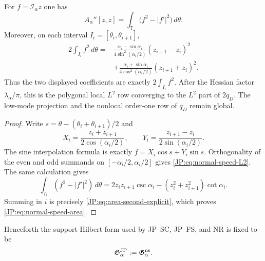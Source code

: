 \begin{proposition}
\label{JP:prop:normal-speed-area}
For $f=\mathcal I_\alpha z$ one has
\begin{equation}\label{JP:eq:normal-speed-area}
 \boxed{A_\alpha''[z,z]
 =\int_{\mathbb T}\bigl(f^2-|f'|^2\bigr)\,d\theta.}
\end{equation}
Moreover, on each interval $I_i=[\theta_i,\theta_{i+1}]$,
\begin{equation}\label{JP:eq:normal-speed-L2}
\begin{aligned}
 2\int_{I_i}f^2\,d\theta
 ={}&\frac{\alpha_i-\sin\alpha_i}{4\sin^2(\alpha_i/2)}
       (z_{i+1}-z_i)^2\\
 &+\frac{\alpha_i+\sin\alpha_i}{4\cos^2(\alpha_i/2)}
       (z_{i+1}+z_i)^2.
\end{aligned}
\end{equation}
Thus the two displayed coefficients are exactly $2\int_{I_i}f^2$.  After
the Hessian factor $\lambda_\alpha/\pi$, this is the polygonal local
$L^2$ row converging to the $L^2$ part of $2q_D$.  The low-mode projection
and the nonlocal order-one row of $q_D$ remain global.
\end{proposition}

\begin{proof}
Write $s=\theta-(\theta_i+\theta_{i+1})/2$ and
\[
 X_i=\frac{z_i+z_{i+1}}{2\cos(\alpha_i/2)},
 \qquad
 Y_i=\frac{z_{i+1}-z_i}{2\sin(\alpha_i/2)}.
\]
The sine interpolation formula is exactly
$f=X_i\cos s+Y_i\sin s$.  Orthogonality of the even and odd summands on
$[-\alpha_i/2,\alpha_i/2]$ gives \eqref{JP:eq:normal-speed-L2}.  The same
calculation gives
\[
 \int_{I_i}(f^2-|f'|^2)\,d\theta
 =2z_iz_{i+1}\csc\alpha_i
  -(z_i^2+z_{i+1}^2)\cot\alpha_i.
\]
Summing in $i$ is precisely \eqref{JP:eq:area-second-explicit}, which proves
\eqref{JP:eq:normal-speed-area}.
\end{proof}

Henceforth the support Hilbert form used by JP--SC, JP--FS, and NR is fixed
to be
\begin{equation}\label{JP:eq:JP-metric-fixed}
 \mathfrak G^{\rm JP}_\alpha:=\mathfrak G_\alpha^{\rm ns}.
\end{equation}

